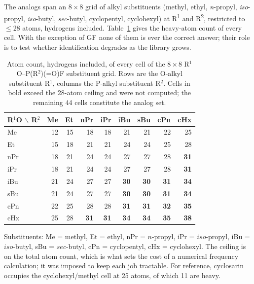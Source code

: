 \documentclass[11pt]{article}
\begin{document}
The analogs span an $8\times8$ grid of alkyl substituents (methyl, ethyl,
\textit{n}-propyl, \textit{iso}-propyl, \textit{iso}-butyl, \textit{sec}-butyl,
cyclopentyl, cyclohexyl) at R\textsuperscript{1} and R\textsuperscript{2}, restricted to
$\leq$28 atoms, hydrogens included. Table~\ref{tab:si-grid} gives the heavy-atom count of every cell.
With the exception of GF none of them is ever the correct answer; their role is to test
whether identification degrades as the library grows.

\begin{table}[htbp]
\centering
\caption{Atom count, hydrogens included, of every cell of the $8\times8$ R$^1$O--P(R$^2$)(=O)F substituent grid. Rows are the O-alkyl substituent R$^1$, columns the P-alkyl substituent R$^2$. Cells in bold exceed the 28-atom ceiling and were not computed; the remaining 44 cells constitute the analog set.}
\label{tab:si-grid}
\small
\begin{tabular}{lrrrrrrrr}
\toprule
R$^1$O $\backslash$ R$^2$ & Me & Et & nPr & iPr & iBu & sBu & cPn & cHx \\
\midrule
Me & 12 & 15 & 18 & 18 & 21 & 21 & 22 & 25 \\
Et & 15 & 18 & 21 & 21 & 24 & 24 & 25 & 28 \\
nPr & 18 & 21 & 24 & 24 & 27 & 27 & 28 & \textbf{31} \\
iPr & 18 & 21 & 24 & 24 & 27 & 27 & 28 & \textbf{31} \\
iBu & 21 & 24 & 27 & 27 & \textbf{30} & \textbf{30} & \textbf{31} & \textbf{34} \\
sBu & 21 & 24 & 27 & 27 & \textbf{30} & \textbf{30} & \textbf{31} & \textbf{34} \\
cPn & 22 & 25 & 28 & 28 & \textbf{31} & \textbf{31} & \textbf{32} & \textbf{35} \\
cHx & 25 & 28 & \textbf{31} & \textbf{31} & \textbf{34} & \textbf{34} & \textbf{35} & \textbf{38} \\
\bottomrule
\end{tabular}

\begin{flushleft}\footnotesize Substituents: Me = methyl, Et = ethyl, nPr = $n$-propyl, iPr = $iso$-propyl, iBu = $iso$-butyl, sBu = $sec$-butyl, cPn = cyclopentyl, cHx = cyclohexyl. The ceiling is on the total atom count, which is what sets the cost of a numerical frequency calculation; it was imposed to keep each job tractable. For reference, cyclosarin occupies the cyclohexyl/methyl cell at 25 atoms, of which 11 are heavy.\end{flushleft}
\end{table}
\clearpage
\end{document}

